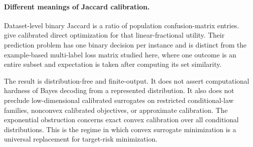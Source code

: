 \documentclass[twoside]{article}
\newcommand{\1}{\mathbf 1}
\begin{document}
\paragraph{Different meanings of Jaccard calibration.} Dataset-level binary Jaccard is a ratio of population confusion-matrix entries. \citet{bao2020calibrated} give calibrated direct optimization for that linear-fractional utility. Their prediction problem has one binary decision per instance and is distinct from the example-based multi-label loss matrix studied here, where one outcome is an entire subset and expectation is taken after computing its set similarity.

The result is distribution-free and finite-output. It does not assert computational hardness of Bayes decoding from a represented distribution. It also does not preclude low-dimensional calibrated surrogates on restricted conditional-law families, nonconvex calibrated objectives, or approximate calibration. The exponential obstruction concerns exact convex calibration over all conditional distributions. This is the regime in which convex surrogate minimization is a universal replacement for target-risk minimization.



\clearpage
\appendix
\end{document}
